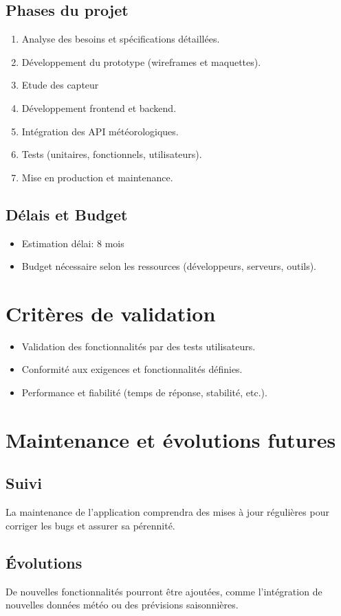 \documentclass[a4paper,12pt]{article}
\begin{document}
\subsection{Phases du projet}
\begin{enumerate}
    \item Analyse des besoins et spécifications détaillées.
    \item Développement du prototype (wireframes et maquettes).
   \item Etude des capteur
    \item Développement frontend et backend.
    \item Intégration des API météorologiques.
    \item Tests (unitaires, fonctionnels, utilisateurs).
    \item Mise en production et maintenance.
\end{enumerate}

\subsection{Délais et Budget}
\begin{itemize}
    \item Estimation délai: 8 mois 
    \item Budget nécessaire selon les ressources (développeurs, serveurs, outils).
\end{itemize}

\section{Critères de validation}
\begin{itemize}
    \item Validation des fonctionnalités par des tests utilisateurs.
    \item Conformité aux exigences et fonctionnalités définies.
    \item Performance et fiabilité (temps de réponse, stabilité, etc.).
\end{itemize}

\section{Maintenance et évolutions futures}
\subsection{Suivi}
La maintenance de l'application comprendra des mises à jour régulières pour corriger les bugs et assurer sa pérennité.

\subsection{Évolutions}
De nouvelles fonctionnalités pourront être ajoutées, comme l'intégration de nouvelles données météo ou des prévisions saisonnières.
\end{document}
